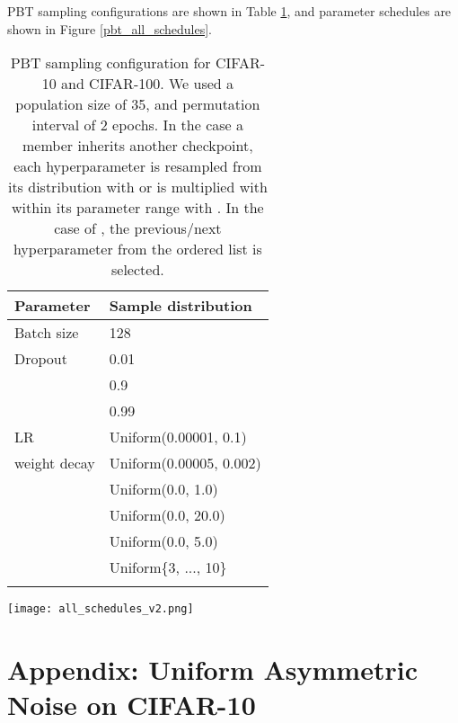 \documentclass{article}
\begin{document}
PBT sampling configurations are shown in Table \ref{table_pbtconfiguration}, and parameter schedules are shown in Figure \ref{pbt_all_schedules}.

\begin{table}
\centering
\caption{PBT sampling configuration for CIFAR-10 and CIFAR-100. We used a population size of 35, and permutation interval of 2 epochs. In the case a member inherits another checkpoint, each hyperparameter is resampled from its distribution with  or is multiplied with  within its parameter range with . In the case of , the previous/next hyperparameter from the ordered list is selected.}
\begin{tabular}{ll}
\toprule
Parameter    & Sample distribution \\
\midrule
Batch size        & 128                    \\
Dropout           & 0.01                    \\
             & 0.9                    \\
            & 0.99                    \\
LR                & Uniform(0.00001, 0.1)                     \\
weight decay      & Uniform(0.00005, 0.002)                    \\
               & Uniform(0.0, 1.0)                 \\
    & Uniform(0.0, 20.0)                    \\
    & Uniform(0.0, 5.0)                    \\
             & Uniform\{3, ..., 10\}  \\
\bottomrule
\label{table_pbtconfiguration}
\end{tabular}
\end{table}

\begin{figure*}[h]
  \centering
  \texttt{[image: all\_schedules\_v2.png]}
  \caption{Parameter schedules for , , JSD weight , ECR weight ,  and  for CIFAR-10 and CIFAR-100 with 40\% and 80\% uniform symmetric noise rates.}
  \label{pbt_all_schedules}
\end{figure*}



\section{Appendix: Uniform Asymmetric Noise on CIFAR-10}
\label{appendix:asym}
\end{document}
